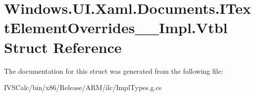 \hypertarget{struct_windows_1_1_u_i_1_1_xaml_1_1_documents_1_1_i_text_element_overrides_____impl_1_1_vtbl}{}\section{Windows.\+U\+I.\+Xaml.\+Documents.\+I\+Text\+Element\+Overrides\+\_\+\+\_\+\+Impl.\+Vtbl Struct Reference}
\label{struct_windows_1_1_u_i_1_1_xaml_1_1_documents_1_1_i_text_element_overrides_____impl_1_1_vtbl}


The documentation for this struct was generated from the following file\+:\begin{DoxyCompactItemize}
\item 
I\+V\+S\+Calc/bin/x86/\+Release/\+A\+R\+M/ilc/Impl\+Types.\+g.\+cs\end{DoxyCompactItemize}
